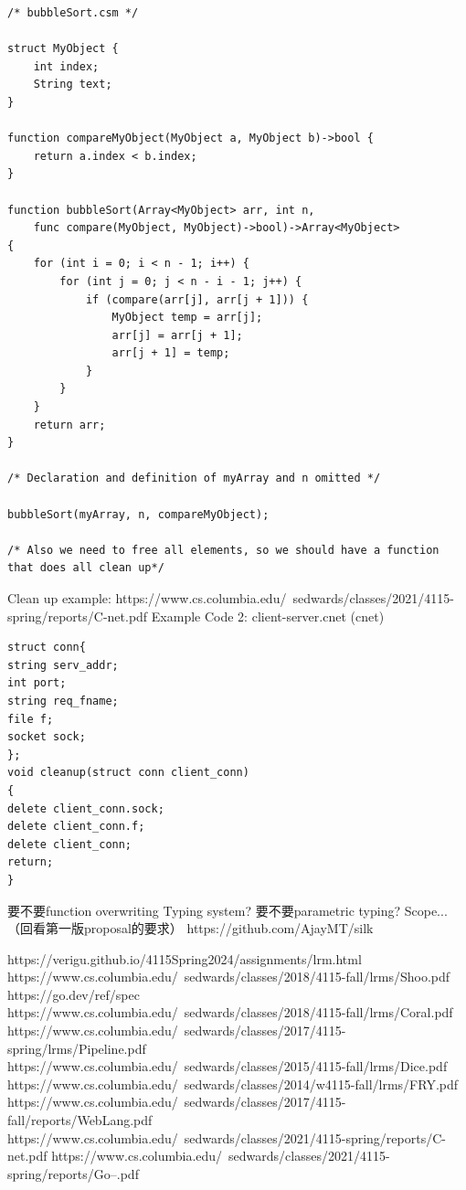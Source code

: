 \documentclass[11pt,A4]{article}
\begin{document}
\begin{lstlisting}
/* bubbleSort.csm */

struct MyObject {
    int index;
    String text;
}

function compareMyObject(MyObject a, MyObject b)->bool {
    return a.index < b.index;
}

function bubbleSort(Array<MyObject> arr, int n,
    func compare(MyObject, MyObject)->bool)->Array<MyObject>
{
    for (int i = 0; i < n - 1; i++) {
        for (int j = 0; j < n - i - 1; j++) {
            if (compare(arr[j], arr[j + 1])) {
                MyObject temp = arr[j];
                arr[j] = arr[j + 1];
                arr[j + 1] = temp;
            }
        }
    }
    return arr;
}

/* Declaration and definition of myArray and n omitted */

bubbleSort(myArray, n, compareMyObject);

/* Also we need to free all elements, so we should have a function that does all clean up*/
\end{lstlisting}

Clean up example: https://www.cs.columbia.edu/~sedwards/classes/2021/4115-spring/reports/C-net.pdf
Example Code 2: client-server.cnet (cnet)
\begin{lstlisting}
struct conn{
string serv_addr;
int port;
string req_fname;
file f;
socket sock;
};
void cleanup(struct conn client_conn)
{
delete client_conn.sock;
delete client_conn.f;
delete client_conn;
return;
}
\end{lstlisting}

要不要function overwriting
Typing system? 要不要parametric typing?
Scope... （回看第一版proposal的要求）
https://github.com/AjayMT/silk

https://verigu.github.io/4115Spring2024/assignments/lrm.html
https://www.cs.columbia.edu/~sedwards/classes/2018/4115-fall/lrms/Shoo.pdf
https://go.dev/ref/spec
https://www.cs.columbia.edu/~sedwards/classes/2018/4115-fall/lrms/Coral.pdf
https://www.cs.columbia.edu/~sedwards/classes/2017/4115-spring/lrms/Pipeline.pdf
https://www.cs.columbia.edu/~sedwards/classes/2015/4115-fall/lrms/Dice.pdf
https://www.cs.columbia.edu/~sedwards/classes/2014/w4115-fall/lrms/FRY.pdf
https://www.cs.columbia.edu/~sedwards/classes/2017/4115-fall/reports/WebLang.pdf
https://www.cs.columbia.edu/~sedwards/classes/2021/4115-spring/reports/C-net.pdf
https://www.cs.columbia.edu/~sedwards/classes/2021/4115-spring/reports/Go--.pdf
\end{document}
